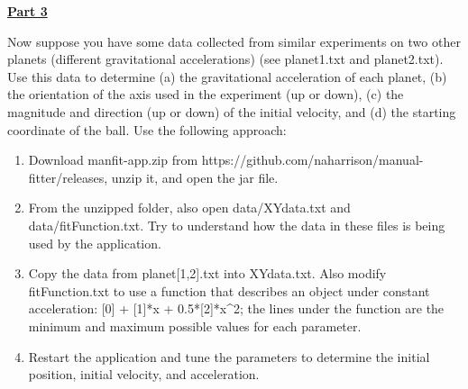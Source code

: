 \documentclass[12pt]{article}
\begin{document}
\underline{\textbf{Part 3}} \par
Now suppose you have some data collected from similar experiments on two other planets (different gravitational accelerations) (see planet1.txt and planet2.txt).
Use this data to determine
(a) the gravitational acceleration of each planet,
(b) the orientation of the axis used in the experiment (up or down),
(c) the magnitude and direction (up or down) of the initial velocity, and
(d) the starting coordinate of the ball.
Use the following approach:
\begin{enumerate}
\item Download manfit-app.zip from https://github.com/naharrison/manual-fitter/releases, unzip it, and open the jar file.
\item From the unzipped folder, also open data/XYdata.txt and data/fitFunction.txt. Try to understand how the data in these files is being used by the application.
\item Copy the data from planet[1,2].txt into XYdata.txt. Also modify fitFunction.txt to use a function that describes an object under constant acceleration: [0] + [1]*x + 0.5*[2]*x\string^2; the lines under the function are the minimum and maximum possible values for each parameter.
\item Restart the application and tune the parameters to determine the initial position, initial velocity, and acceleration.
\end{enumerate}
\end{document}
